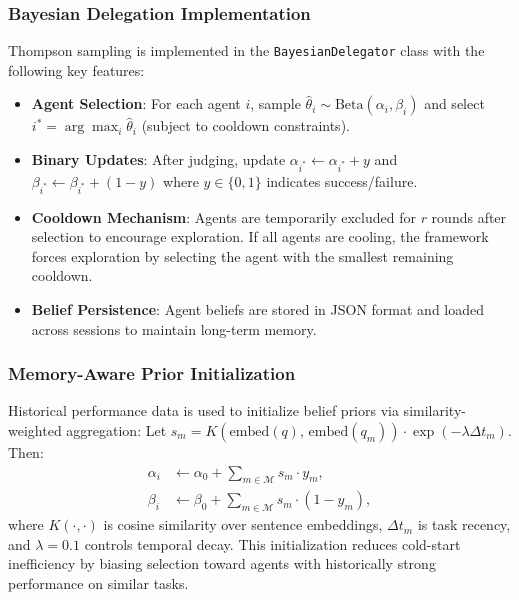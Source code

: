   \subsubsection{Bayesian Delegation Implementation}
  Thompson sampling is implemented in the \texttt{BayesianDelegator} class with the following key features:
  \begin{itemize}[leftmargin=1.4em]
      \item \textbf{Agent Selection}: For each agent $i$, sample $\hat{\theta}_i \sim \mathrm{Beta}(\alpha_i, \beta_i)$ and select $i^* = \arg\max_i \hat{\theta}_i$ (subject to cooldown constraints).
      \item \textbf{Binary Updates}: After judging, update $\alpha_{i^*} \leftarrow \alpha_{i^*} + y$ and $\beta_{i^*} \leftarrow \beta_{i^*} + (1-y)$ where $y \in \{0,1\}$ indicates success/failure.
      \item \textbf{Cooldown Mechanism}: Agents are temporarily excluded for $r$ rounds after selection to encourage exploration. If all agents are cooling, the framework forces exploration by selecting the agent with the smallest remaining cooldown.
      \item \textbf{Belief Persistence}: Agent beliefs are stored in JSON format and loaded across sessions to maintain long-term memory.
  \end{itemize}

  \subsubsection{Memory-Aware Prior Initialization}
  Historical performance data is used to initialize belief priors via similarity-weighted aggregation:
  Let $s_m = K(\mathrm{embed}(q),\, \mathrm{embed}(q_m)) \cdot \exp(-\lambda \Delta t_m)$. Then:
  \begin{align}
  \alpha_i &\leftarrow \alpha_0 + \textstyle\sum_{m \in \mathcal{M}} s_m \cdot y_m, \\
  \beta_i  &\leftarrow \beta_0  + \textstyle\sum_{m \in \mathcal{M}} s_m \cdot (1 - y_m),
  \end{align}
  where $K(\cdot, \cdot)$ is cosine similarity over sentence embeddings, $\Delta t_m$ is task recency, and $\lambda = 0.1$ controls temporal decay. This initialization reduces cold-start inefficiency by biasing selection toward agents with historically strong performance on similar
  tasks.

